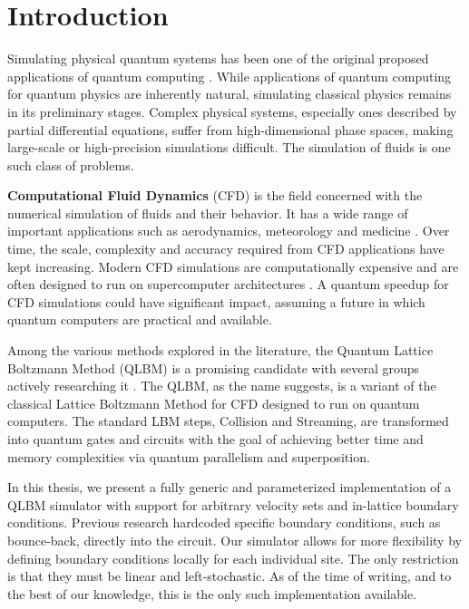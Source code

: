 \chapter{Introduction}
\label{chapter:intro}

Simulating physical quantum systems has been one of the original proposed applications of quantum computing \cite{feynman2018simulating}.
While applications of quantum computing for quantum physics are inherently natural, simulating classical physics remains in its preliminary stages.
Complex physical systems, especially ones described by partial differential equations, suffer from high-dimensional phase spaces,
making large-scale or high-precision simulations difficult.
The simulation of fluids is one such class of problems.

\textbf{Computational Fluid Dynamics} (CFD) is the field concerned with the numerical simulation of fluids and their behavior.
It has a wide range of important applications such as aerodynamics, meteorology and medicine \cite{blazek2015computational}.
Over time, the scale, complexity and accuracy required from CFD applications have kept increasing.
Modern CFD simulations are computationally expensive and are often designed to run on supercomputer architectures \cite{karp2024experience}.
A quantum speedup for CFD simulations could have significant impact, assuming a future in which quantum computers are practical and available.

Among the various methods explored in the literature, the Quantum Lattice Boltzmann Method (QLBM) is a promising candidate with several groups actively researching it \cite{budinski2021quantum,itani2024quantum,kocherla2024fully, xu2025improved, tiwari2025algorithmic,wawrzyniak2025base}.
The QLBM, as the name suggests, is a variant of the classical Lattice Boltzmann Method for CFD designed to run on quantum computers.
The standard LBM steps, Collision and Streaming, are transformed into quantum gates and circuits with the goal of achieving better time and memory complexities via quantum parallelism and superposition.

In this thesis, we present a fully generic and parameterized implementation of a QLBM simulator with support for arbitrary velocity sets and in-lattice boundary conditions.
Previous research hardcoded specific boundary conditions, such as bounce-back, directly into the circuit.
Our simulator allows for more flexibility by defining boundary conditions locally for each individual site. The only restriction is that they must be linear and left-stochastic.
As of the time of writing, and to the best of our knowledge, this is the only such implementation available.

